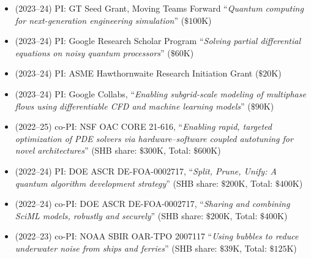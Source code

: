 \begin{itemize}
    \item (2023--24) PI: GT Seed Grant, Moving Teams Forward ``\textit{Quantum computing for next-generation engineering simulation}'' ($\$100$K)
    \item (2023--24) PI: Google Research Scholar Program ``\textit{Solving partial differential equations on noisy quantum processors}'' ($\$60$K)
    \item (2023--24) PI: ASME Hawthornwaite Research Initiation Grant ($\$20$K)
    \item (2023--24) PI: Google Collabs, ``\textit{Enabling subgrid-scale modeling of multiphase flows using differentiable CFD and machine learning models}'' ($\$90$K)
    \item (2022--25) co-PI: NSF OAC CORE 21-616, ``\textit{Enabling rapid, targeted optimization of PDE solvers via hardware--software coupled autotuning for novel architectures}'' (SHB share: $\$300$K, Total: $\$600$K)
    \item (2022--24) PI: DOE ASCR DE-FOA-0002717, ``\textit{Split, Prune, Unify: A quantum algorithm development strategy}'' (SHB share: $\$200$K, Total: $\$400$K)
    \item (2022--24) co-PI: DOE ASCR DE-FOA-0002717, ``\textit{Sharing and combining SciML models, robustly and securely}'' (SHB share: $\$200$K, Total: $\$400$K)
    \item (2022--23) co-PI: NOAA SBIR OAR-TPO 2007117 ``\textit{Using bubbles to reduce underwater noise from ships and ferries}'' (SHB share: $\$39$K, Total: $\$125$K)
\end{itemize}
